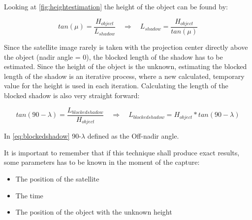 Looking at \autoref{fig:heightestimation} the height of the object can be found by:

\begin{equation}
	tan(\mu) = \frac{H_{object}}{L_{shadow}} \quad \Rightarrow \quad L_{shadow} = \frac{H_{object}}{tan(\mu)}
\end{equation}

Since the satellite image rarely is taken with the projection center directly above the object (nadir angle = 0\textdegree), the blocked length of the shadow has to be estimated. Since the height of the object is the unknown, estimating the blocked length of the shadow is an iterative process, where a new calculated, temporary value for the height is used in each iteration. Calculating the length of the blocked shadow is also very straight forward: 

\begin{equation}\label{eq:blockedshadow}
	tan(90 - \lambda) = \frac{L_{blockedshadow}}{H_{object}} \quad \Rightarrow \quad L_{blockedshadow} = H_{object}*tan(90-\lambda)
\end{equation}

In \autoref{eq:blockedshadow} 90-$\lambda$ defined as the Off-nadir angle.

It is important to remember that if this technique shall produce exact results, some parameters has to be known in the moment of the capture:

\begin{itemize}
	\item The position of the satellite
	\item The time
	\item The position of the object with the unknown height
\end{itemize}
